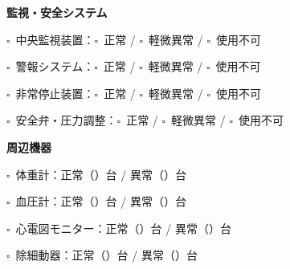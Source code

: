 \documentclass[a4paper,12pt]{jarticle}
\newcommand{\checkbox}{$\square$\ }
\newcommand{\underlinespace}[1]{\underline{\hspace{#1}}}
\begin{document}
\vspace{8mm}

\begin{center}
\textbf{\large 監視・安全システム}
\end{center}

\vspace{3mm}

\noindent
\checkbox 中央監視装置：\quad \checkbox 正常 \quad / \quad \checkbox 軽微異常 \quad / \quad \checkbox 使用不可

\vspace{2mm}

\noindent
\checkbox 警報システム：\quad \checkbox 正常 \quad / \quad \checkbox 軽微異常 \quad / \quad \checkbox 使用不可

\vspace{2mm}

\noindent
\checkbox 非常停止装置：\quad \checkbox 正常 \quad / \quad \checkbox 軽微異常 \quad / \quad \checkbox 使用不可

\vspace{2mm}

\noindent
\checkbox 安全弁・圧力調整：\quad \checkbox 正常 \quad / \quad \checkbox 軽微異常 \quad / \quad \checkbox 使用不可

\vspace{8mm}

\begin{center}
\textbf{\large 周辺機器}
\end{center}

\vspace{3mm}

\noindent
\checkbox 体重計：\quad 正常（\underlinespace{1.5cm}）台 \quad / \quad 異常（\underlinespace{1.5cm}）台

\vspace{2mm}

\noindent
\checkbox 血圧計：\quad 正常（\underlinespace{1.5cm}）台 \quad / \quad 異常（\underlinespace{1.5cm}）台

\vspace{2mm}

\noindent
\checkbox 心電図モニター：\quad 正常（\underlinespace{1.5cm}）台 \quad / \quad 異常（\underlinespace{1.5cm}）台

\vspace{2mm}

\noindent
\checkbox 除細動器：\quad 正常（\underlinespace{1.5cm}）台 \quad / \quad 異常（\underlinespace{1.5cm}）台
\end{document}
